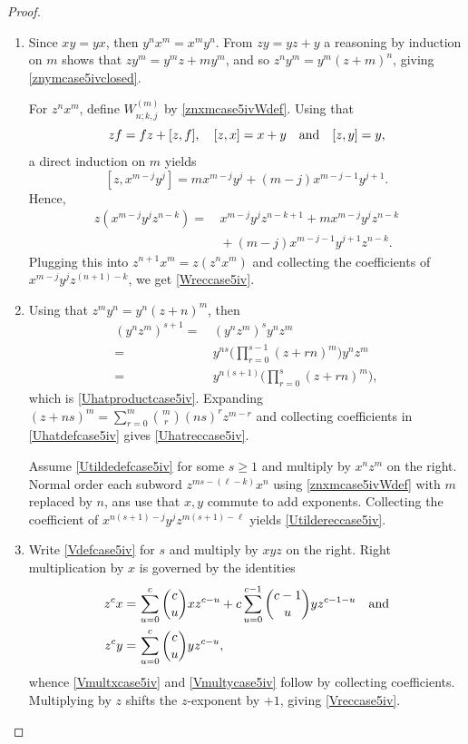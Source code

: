\documentclass{amsart}
\theoremstyle{definition}
\theoremstyle{remark}
\numberwithin{equation}{section}
\begin{document}
\begin{proof}
\begin{enumerate}
\item [\rm (1)] Since $xy = yx$, then $y^n x^m = x^m y^n$. From $zy = yz+y$ a reasoning by induction on $m$ shows that $z y^m=y^m z+m y^m$, and so 
$z^n y^m=y^m(z+m)^n$, giving \eqref{znymcase5ivclosed}.

For $z^n x^m$, define $W^{(m)}_{n;k,j}$ by \eqref{znxmcase5ivWdef}. Using that
$$
zf = fz + [z,f], \quad [z, x] = x+y \quad {\rm and} \quad [z, y ] = y,
$$
a direct induction on $m$ yields
\[
[z,x^{m-j}y^j]=m x^{m-j}y^j+(m-j) x^{m-j-1}y^{j+1}.
\]
Hence, 
\begin{align*}
z\left(x^{m-j}y^j z^{n-k}\right) = &\, x^{m-j}y^j z^{n-k+1}+m x^{m-j}y^j z^{n-k} \\
&\, +(m-j) x^{m-j-1}y^{j+1}z^{n-k}.
\end{align*}
Plugging this into $z^{n+1}x^m=z(z^n x^m)$ and collecting the coefficients of $x^{m-j}y^j z^{(n+1)-k}$, we get \eqref{Wreccase5iv}.

\item [\rm (2)] Using that $z^m y^n = y^n(z+n)^m$, then 
\begin{align*}
(y^n z^m)^{s+1} = &\, (y^n z^m)^s y^n z^m \\  
= &\, y^{ns}\Big(\prod_{r=0}^{s-1}(z+rn)^m\Big)y^n z^m \\
= &\, y^{n(s+1)}\Big(\prod_{r=0}^{s}(z+rn)^m\Big),
\end{align*}
which is \eqref{Uhatproductcase5iv}. Expanding $(z+ns)^m = \sum_{r=0}^{m}\binom{m}{r}(ns)^r z^{m-r}$ and collecting coefficients in \eqref{Uhatdefcase5iv} gives \eqref{Uhatreccase5iv}.

Assume \eqref{Utildedefcase5iv} for some $s\ge 1$ and multiply by $x^n z^m$ on the right. Normal order each subword $z^{ms-(\ell-k)}x^n$ using \eqref{znxmcase5ivWdef} with $m$ replaced by $n$, ans use that $x,y$ commute to add exponents. Collecting the coefficient of $x^{n(s+1)-j}y^{j}z^{m(s+1)-\ell}$ yields \eqref{Utildereccase5iv}.

\item [\rm (3)] Write \eqref{Vdefcase5iv} for $s$ and multiply by $xyz$ on the right.
Right multiplication by $x$ is governed by the identities
\begin{align*}
z^{c}x = &\, \sum_{u=0}^{c}\binom{c}{u}xz^{c-u}+ c\sum_{u=0}^{c-1}\binom{c-1}{u}yz^{c-1-u} \quad {\rm and} \\
z^{c}y = &\, \sum_{u=0}^{c}\binom{c}{u}yz^{c-u}, 
\end{align*}
whence \eqref{Vmultxcase5iv} and \eqref{Vmultycase5iv} follow by collecting coefficients. Multiplying by $z$ shifts the $z$-exponent by $+1$, giving \eqref{Vreccase5iv}.


\end{enumerate}
\end{proof}
\end{document}
